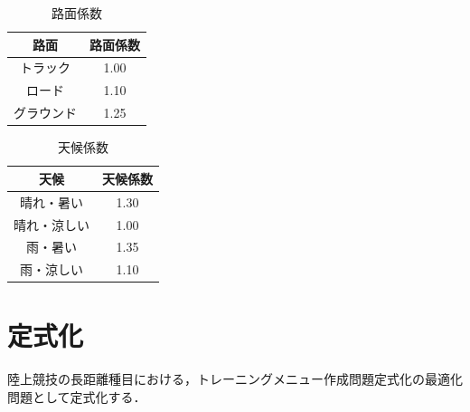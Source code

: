 \documentclass[12pt,fleqn]{jreport}
\begin{document}
\begin{longtable}{|c|c|}
  \caption{路面係数}    \\
  \hline
  路面       & 路面係数 \\
  \hline
  トラック   & 1.00     \\
  \hline
  ロード     & 1.10     \\
  \hline
  グラウンド & 1.25     \\
  \hline
\end{longtable}
\newpage
\begin{longtable}{|c|c|}
  \caption{天候係数}      \\
  \hline
  天候         & 天候係数 \\
  \hline
  晴れ・暑い   & 1.30     \\
  \hline
  晴れ・涼しい & 1.00     \\
  \hline
  雨・暑い     & 1.35     \\
  \hline
  雨・涼しい   & 1.10     \\
  \hline
\end{longtable}
\newpage
\chapter{定式化}

陸上競技の長距離種目における，トレーニングメニュー作成問題定式化の最適化問題として定式化する．
\vspace{1cm}
\end{document}
